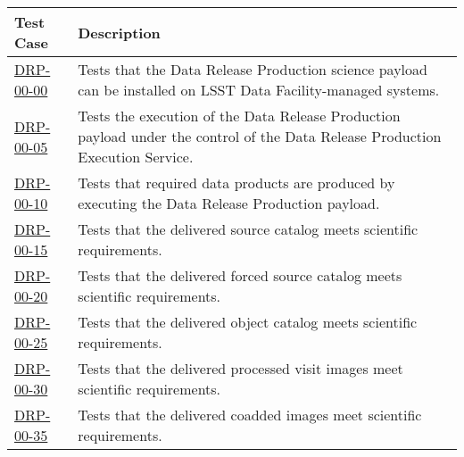 \begin{longtable} {|p{}|p{}|}\hline
\textbf{Test Case}  & \textbf{Description} \\\hline

\hyperref[drp-00-00]{DRP-00-00} & Tests that the Data Release Production science payload can be installed on LSST Data Facility-managed systems.\\\hline
\hyperref[drp-00-05]{DRP-00-05} & Tests the execution of the Data Release Production payload under the control of the Data Release Production Execution Service.\\\hline
\hyperref[drp-00-10]{DRP-00-10} & Tests that required data products are produced by executing the Data Release Production payload. \\\hline
\hyperref[drp-00-15]{DRP-00-15} & Tests that the delivered source catalog meets scientific requirements. \\\hline
\hyperref[drp-00-20]{DRP-00-20} & Tests that the delivered forced source catalog meets scientific requirements. \\\hline
\hyperref[drp-00-25]{DRP-00-25} & Tests that the delivered object catalog meets scientific requirements. \\\hline
\hyperref[drp-00-30]{DRP-00-30} & Tests that the delivered processed visit images meet scientific requirements. \\\hline
\hyperref[drp-00-35]{DRP-00-35} & Tests that the delivered coadded images meet scientific requirements. \\\hline

\end{longtable}
